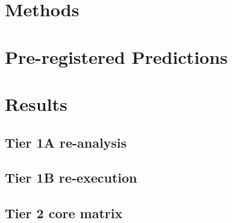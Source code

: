\documentclass{article}
\begin{document}
\section{Methods}

\section{Pre-registered Predictions}

\section{Results}

\subsection{Tier 1A re-analysis}

\subsection{Tier 1B re-execution}

\subsection{Tier 2 core matrix}
\end{document}
